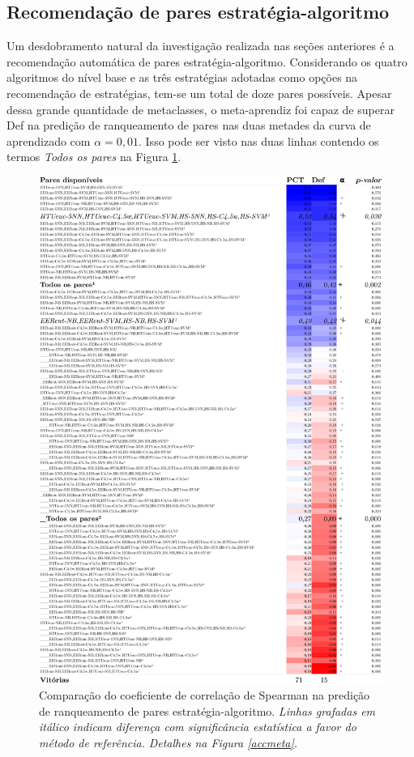\subsection{Recomendação de pares estratégia-algoritmo}\label{recpar}
Um desdobramento natural da investigação realizada nas seções anteriores
é a recomendação automática de pares estratégia-algoritmo.
Considerando os quatro algoritmos do nível base e as três estratégias adotadas como opções na recomendação de estratégias, tem-se um total de doze pares possíveis.
Apesar dessa grande quantidade de metaclasses, o meta-aprendiz foi capaz de superar Def na predição de ranqueamento de pares nas duas metades da curva de aprendizado com $\alpha=0,01$.
Isso pode ser visto nas duas linhas contendo os termos \textit{Todos os pares} na Figura \ref{parcorr}.
\begin{figure}
\centering
\includegraphics[scale=0.21]{images/metaparcorr.pdf}
\caption[Comparação da correlação, predição: ranqueamento estratégia-algoritmo.]{Comparação do coeficiente de correlação de Spearman na predição de ranqueamento de pares estratégia-algoritmo.
\textit{Linhas grafadas em itálico indicam diferença com significância estatística a favor do método de referência.}
\textit{Detalhes na Figura \ref{accmeta}.}}
\label{parcorr}
\end{figure}

